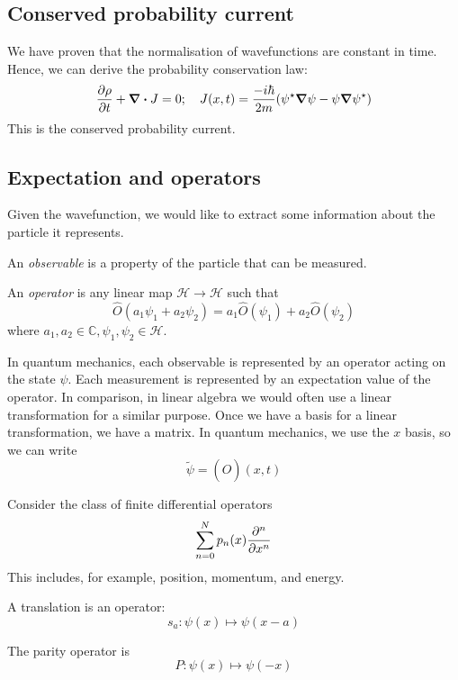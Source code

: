 \subsection{Conserved probability current}
We have proven that the normalisation of wavefunctions are constant in time.
Hence, we can derive the probability conservation law:
\[
	\pdv{\rho}{t}(x,t) + \div{J} = 0;\quad J(x,t) = \frac{-i\hbar}{2m} \qty(\psi^\star \grad{\psi} - \psi \grad{\psi^\star} )
\]
This is the conserved probability current.

\subsection{Expectation and operators}
Given the wavefunction, we would like to extract some information about the particle it represents.
\begin{definition}
	An \textit{observable} is a property of the particle that can be measured.
\end{definition}
\begin{definition}
	An \textit{operator} is any linear map \( \mathcal H \to \mathcal H \) such that
	\[
		\hat O(a_1 \psi_1 + a_2 \psi_2) = a_1 \hat O(\psi_1) + a_2 \hat O(\psi_2)
	\]
	where \( a_1, a_2 \in \mathbb C, \psi_1, \psi_2 \in \mathcal H \).
\end{definition}
\noindent In quantum mechanics, each observable is represented by an operator acting on the state \( \psi \).
Each measurement is represented by an expectation value of the operator.
In comparison, in linear algebra we would often use a linear transformation for a similar purpose.
Once we have a basis for a linear transformation, we have a matrix.
In quantum mechanics, we use the \( x \) basis, so we can write
\[
	\widetilde \psi = (\hat O)(x, t)
\]
\begin{example}
	Consider the class of finite differential operators
	\[
		\sum_{n=0}^N p_n(x) \pdv[n]{x}
	\]
	This includes, for example, position, momentum, and energy.
\end{example}
\begin{example}
	A translation is an operator:
	\[
		s_a \colon \psi(x) \mapsto \psi(x-a)
	\]
\end{example}
\begin{example}
	The parity operator is
	\[
		P \colon \psi(x) \mapsto \psi(-x)
	\]
\end{example}

